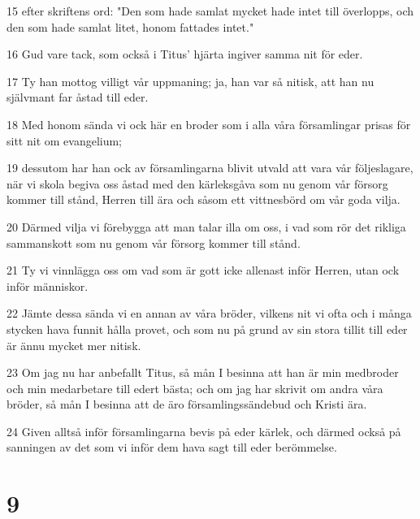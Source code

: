 \par 15 efter skriftens ord: "Den som hade samlat mycket hade intet till överlopps, och den som hade samlat litet, honom fattades intet."
\par 16 Gud vare tack, som också i Titus' hjärta ingiver samma nit för eder.
\par 17 Ty han mottog villigt vår uppmaning; ja, han var så nitisk, att han nu självmant far åstad till eder.
\par 18 Med honom sända vi ock här en broder som i alla våra församlingar prisas för sitt nit om evangelium;
\par 19 dessutom har han ock av församlingarna blivit utvald att vara vår följeslagare, när vi skola begiva oss åstad med den kärleksgåva som nu genom vår försorg kommer till stånd, Herren till ära och såsom ett vittnesbörd om vår goda vilja.
\par 20 Därmed vilja vi förebygga att man talar illa om oss, i vad som rör det rikliga sammanskott som nu genom vår försorg kommer till stånd.
\par 21 Ty vi vinnlägga oss om vad som är gott icke allenast inför Herren, utan ock inför människor.
\par 22 Jämte dessa sända vi en annan av våra bröder, vilkens nit vi ofta och i många stycken hava funnit hålla provet, och som nu på grund av sin stora tillit till eder är ännu mycket mer nitisk.
\par 23 Om jag nu har anbefallt Titus, så mån I besinna att han är min medbroder och min medarbetare till edert bästa; och om jag har skrivit om andra våra bröder, så mån I besinna att de äro församlingssändebud och Kristi ära.
\par 24 Given alltså inför församlingarna bevis på eder kärlek, och därmed också på sanningen av det som vi inför dem hava sagt till eder berömmelse.

\chapter{9}

